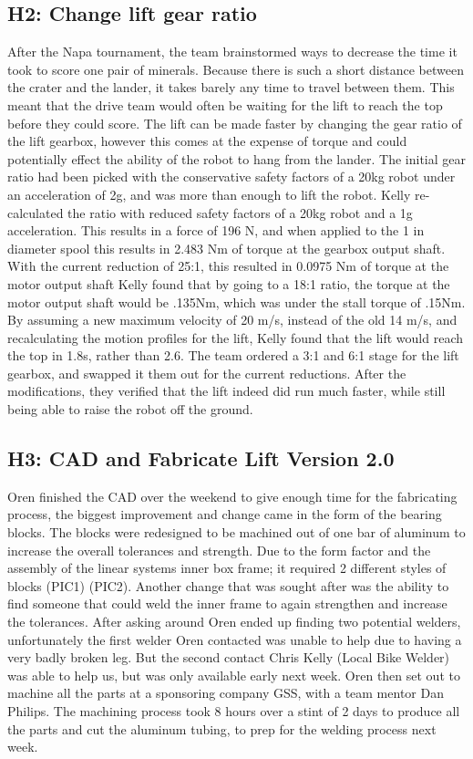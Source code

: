 \documentclass{article}
\begin{document}
\subsection{H2: Change lift gear ratio}

After the Napa tournament, the team brainstormed ways to decrease the time it took to score one pair of minerals. 
Because there is such a short distance between the crater and the lander, it takes barely any time to travel between them. 
This meant that the drive team would often be waiting for the lift to reach the top before they could score.
The lift can be made faster by changing the gear ratio of the lift gearbox, however this comes at the expense of torque and could potentially effect the ability of the robot to hang from the lander.
The initial gear ratio had been picked with the conservative safety factors of a 20kg robot under an acceleration of 2g, and was more than enough to lift the robot. 
Kelly re-calculated the ratio with reduced safety factors of a 20kg robot and a 1g acceleration. 
This results in a force of 196 N, and when applied to the 1 in diameter spool this results in 2.483 Nm of torque at the gearbox output shaft.
With the current reduction of 25:1, this resulted in 0.0975 Nm of torque at the motor output shaft
Kelly found that by going to a 18:1 ratio, the torque at the motor output shaft would be .135Nm, which was under the stall torque of .15Nm.
By assuming a new maximum velocity of 20 m/s, instead of the old 14 m/s, and recalculating the motion profiles for the lift, Kelly found that the lift would reach the top in 1.8s, rather than 2.6.
The team ordered a 3:1 and 6:1 stage for the lift gearbox, and swapped it them out for the current reductions.
After the modifications, they verified that the lift indeed did run much faster, while still being able to raise the robot off the ground. 


\subsection{H3: CAD and Fabricate Lift Version 2.0}

Oren finished the CAD over the weekend to give enough time for the fabricating process, the biggest improvement and change came in the form of the bearing blocks. The blocks were redesigned to be machined out of one bar of aluminum to increase the overall tolerances and strength. Due to the form factor and the assembly of the linear systems inner box frame; it required 2 different styles of blocks (PIC1) (PIC2). Another change that was sought after was the ability to find someone that could weld the inner frame to again strengthen and increase the tolerances. After asking around Oren ended up finding two potential welders, unfortunately the first welder Oren contacted was unable to help due to having a very badly broken leg. But the second contact Chris Kelly (Local Bike Welder) was able to help us, but was only available early next week. Oren then set out to machine all the parts at a sponsoring company GSS, with a team mentor Dan Philips. The machining process took 8 hours over a stint of 2 days to produce all the parts and cut the aluminum tubing, to prep for the welding process next week. 
\end{document}
